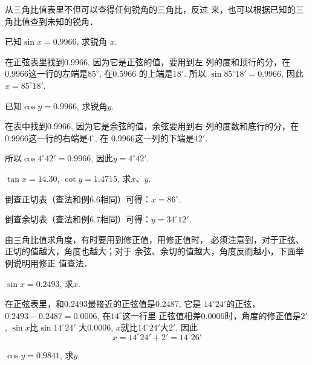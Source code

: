 从三角比值表里不但可以查得任何锐角的三角比，反过
来，也可以根据已知的三角比值查到未知的锐角．

\begin{example}
    已知$\sin x=0.9966$, 求锐角
    $x$.
\end{example}

\begin{solution}
    在正弦表里找到0.9966, 因为它是正弦的值，要用到左
    列的度和顶行的分，在0.9966这一行的左端是$85^{\circ}$, 在0.5966
    的上端是$18'$. 所以
   $ \sin85^{\circ}18'=0.9966$, 因此$x=85^{\circ}18'$.
\end{solution}

\begin{example}
已知$\cos y=0.9966$, 求锐角$y$.
\end{example}

\begin{solution}   
    在表中找到0.9966, 因为它是余弦的值，余弦要用到右
    列的度数和底行的分，在0.9966这一行的右端是$4^{\circ}$, 在
    0.9966这一列的下端是$42'$.

    所以$\cos4^{\circ}42'=0.9966$, 因此$y=4^{\circ}42'$.
\end{solution}

\begin{example}
   $\tan x=14.30$, $\cot y=1.4715$, 求$x$、$y$. 
\end{example}

\begin{solution}
    倒查正切表（查法和例6.6相同）可得：$x=86^{\circ}$.

倒查余切表（查法和例6.7相同）可得：$y=34^{\circ}12'$.
\end{solution}

由三角比值求角度，有时要用到修正值，用修正值时，
必须注意到，对于正弦、正切的值越大，角度也越大；对于
余弦、余切的值越大，角度反而越小，下面举例说明用修正
值查法．

\begin{example}
      $\sin x=0.2493$, 求$x$.
\end{example}

\begin{solution}
在正弦表里，和0.2493最接近的正弦值是0.2487, 它是
$14^{\circ}24'$的正弦，$0.2493-0.2487=0.0006$, 在$14^{\circ}$这一行里
正弦值相差0.0006时，角度的修正值是$2'$, $\sin x$比$\sin14^{\circ}24'$
大0.0006, $x$就比$14^{\circ}24'$大$2'$, 因此
\[x=14^{\circ}24'+2'=14^{\circ}26'\]
\end{solution}

\begin{example}
    $\cos y=0.9841$, 求$y$.
\end{example}

